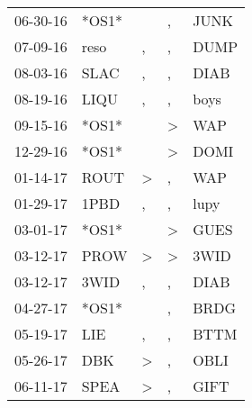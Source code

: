 \begin{supertabular}{p{0.07\textwidth}p{0.06\textwidth}p{0.02\textwidth}p{0.02\textwidth}p{0.06\textwidth}}
          06-30-16\textsuperscript{} &                            *OS1* &                  &             , &  JUNK\textsuperscript{} \\
          07-09-16\textsuperscript{} &           reso\textsuperscript{} &                , &             , &  DUMP\textsuperscript{} \\
          08-03-16\textsuperscript{} &           SLAC\textsuperscript{} &                , &             , &  DIAB\textsuperscript{} \\
          08-19-16\textsuperscript{} &           LIQU\textsuperscript{} &                , &             , &  boys\textsuperscript{} \\
          09-15-16\textsuperscript{} &                            *OS1* &                  &  \textgreater &   WAP\textsuperscript{} \\
          12-29-16\textsuperscript{} &                            *OS1* &                  &  \textgreater &  DOMI\textsuperscript{} \\
          01-14-17\textsuperscript{} &           ROUT\textsuperscript{} &     \textgreater &             , &   WAP\textsuperscript{} \\
          01-29-17\textsuperscript{} &           1PBD\textsuperscript{} &                , &             , &  lupy\textsuperscript{} \\
          03-01-17\textsuperscript{} &                            *OS1* &                  &  \textgreater &  GUES\textsuperscript{} \\
          03-12-17\textsuperscript{} &           PROW\textsuperscript{} &     \textgreater &  \textgreater &  3WID\textsuperscript{} \\
          03-12-17\textsuperscript{} &           3WID\textsuperscript{} &                , &             , &  DIAB\textsuperscript{} \\
          04-27-17\textsuperscript{} &                            *OS1* &                  &             , &  BRDG\textsuperscript{} \\
          05-19-17\textsuperscript{} &            LIE\textsuperscript{} &                , &             , &  BTTM\textsuperscript{} \\
          05-26-17\textsuperscript{} &            DBK\textsuperscript{} &     \textgreater &             , &  OBLI\textsuperscript{} \\
          06-11-17\textsuperscript{} &           SPEA\textsuperscript{} &     \textgreater &             , &  GIFT\textsuperscript{} \\

\end{supertabular}
